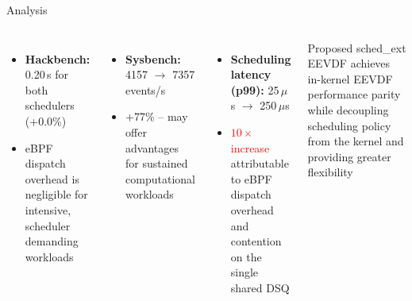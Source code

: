 \documentclass[aspectratio=169]{beamer}
\begin{document}
\begin{frame}{Analysis}
        \begin{columns}
                \begin{itemize}
                        \item \textbf{Hackbench:} 0.20\,s for both
                                schedulers (+0.0\%)
                                \vspace{0.1cm}
                        \item[$\to$] eBPF dispatch overhead is
                                negligible for intensive,
                                scheduler demanding workloads
                \end{itemize}

                \vspace{0.4cm}
                \begin{itemize}
                        \item \textbf{Sysbench:}
                                4157 $\to$ 7357 events/s
                                \vspace{0.1cm}
                        \item[$\to$] \textcolor[rgb]{0, 0.6, 0.1}{+77\%}
                                -- may offer advantages for
                                sustained computational workloads
                \end{itemize}

                \begin{itemize}
                        \item \textbf{Scheduling latency (p99):}
                                25\,$\mu$s $\to$ 250\,$\mu$s
                                \vspace{0.1cm}
                        \item[$\to$] \textcolor{red}{$10\times$
                                increase} attributable to eBPF
                                dispatch overhead and contention
                                on the single shared DSQ
                \end{itemize}

                \vspace{0.4cm}
                \begin{shadowbox}
                        \footnotesize{Proposed sched\_ext EEVDF
                                achieves in-kernel EEVDF performance parity
                                while decoupling scheduling policy
                                from the kernel
                        and providing greater flexibility}
                \end{shadowbox}
        \end{columns}
\end{frame}
\end{document}
